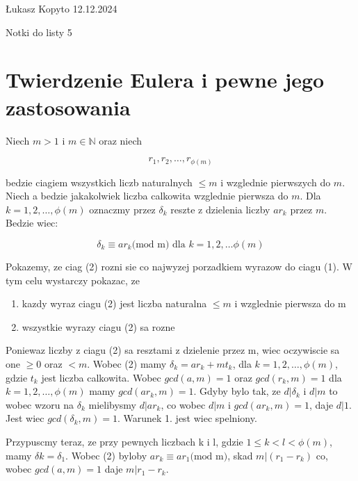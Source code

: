 \documentclass[12]{article}
\begin{document}
\noindent \L ukasz Kopyto \hfill 12.12.2024 \\

\begin{center}

    {\large Notki do listy 5}
\end{center}
\section*{Twierdzenie Eulera i pewne jego zastosowania}


Niech $m > 1$ i $m\in \mathbb{N}$ oraz niech

\[r_{1}, r_{2}, \dots, r_{\phi(m)} \tag{1}\]

bedzie ciagiem wszystkich liczb naturalnych $\leq m$ i wzglednie pierwszych do $m$. Niech a bedzie jakakolwiek liczba calkowita wzglednie pierwsza do $m$. Dla $k=1,2,\dots, \phi(m)$ oznaczmy przez $\delta_{k}$ reszte z dzielenia liczby $ar_{k}$ przez $m$. Bedzie wiec:

\[ \delta_{k}\equiv ar_{k}\text{(mod m) dla } k = 1,2,\dots \phi(m)\tag{2}\]

Pokazemy, ze ciag (2) rozni sie co najwyzej porzadkiem wyrazow do ciagu (1). W tym celu wystarczy pokazac, ze
\begin{enumerate}
    \item kazdy wyraz ciagu (2) jest liczba naturalna $\leq m$ i wzglednie pierwsza do m
    \item wszystkie wyrazy ciagu (2) sa rozne
\end{enumerate}

Poniewaz liczby z ciagu (2) sa resztami z dzielenie przez m, wiec oczywiscie sa one $\geq 0$ oraz $< m$. Wobec (2) mamy $\delta_{k} = ar_{k} + mt_{k}$, dla $k = 1, 2, \dots, \phi(m)$, gdzie $t_{k}$ jest liczba calkowita. Wobec $gcd(a, m) = 1$ oraz $gcd(r_{k}, m) = 1$ dla $k = 1,2,\dots, \phi(m)$ mamy $gcd(ar_{k}, m) = 1$. Gdyby bylo tak, ze $d | \delta_{k}$ i $d|m$ to wobec wzoru na $\delta_{k}$ mielibysmy $d|ar_{k}$, co wobec $d|m$ i $gcd(ar_{k}, m) = 1$, daje $d|1$. Jest wiec $gcd(\delta_{k}, m)= 1$. Warunek 1. jest wiec spelniony.

Przypuscmy teraz, ze przy pewnych liczbach k i l, gdzie $1\leq k < l < \phi(m)$, mamy $\delta{k} = \delta_{1}$. Wobec (2) byloby $ar_{k} \equiv ar_{1}\text{(mod m)}$, skad $m| (r_{1} - r_{k})$ co, wobec $gcd(a,m) = 1$ daje $m| r_{1} - r_{k}$.
\end{document}

